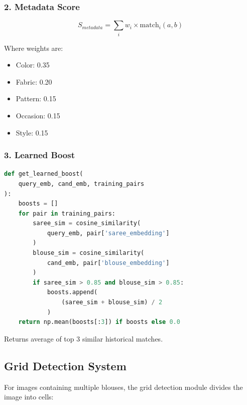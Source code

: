 \documentclass[12pt,a4paper]{report}
\begin{document}
\subsubsection{2. Metadata Score}

\begin{equation}
S_{metadata} = \sum_{i} w_i \times \text{match}_i(a, b)
\end{equation}

Where weights are:
\begin{itemize}
    \item Color: 0.35
    \item Fabric: 0.20
    \item Pattern: 0.15
    \item Occasion: 0.15
    \item Style: 0.15
\end{itemize}

\subsubsection{3. Learned Boost}

\begin{lstlisting}[language=Python]
def get_learned_boost(
    query_emb, cand_emb, training_pairs
):
    boosts = []
    for pair in training_pairs:
        saree_sim = cosine_similarity(
            query_emb, pair['saree_embedding']
        )
        blouse_sim = cosine_similarity(
            cand_emb, pair['blouse_embedding']
        )
        if saree_sim > 0.85 and blouse_sim > 0.85:
            boosts.append(
                (saree_sim + blouse_sim) / 2
            )
    return np.mean(boosts[:3]) if boosts else 0.0
\end{lstlisting}

Returns average of top 3 similar historical matches.

\subsection{Grid Detection System}

For images containing multiple blouses, the grid detection module divides the image into cells:
\end{document}
